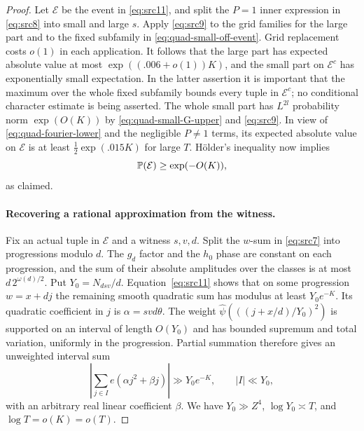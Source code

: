 \begin{proof}
Let $\mathcal E$ be the event in \eqref{eq:src11}, and split the
$P=1$ inner expression in \eqref{eq:src8} into small and large $s$.
Apply \eqref{eq:src9} to the grid families for the large part and to
the fixed subfamily in \eqref{eq:quad-small-off-event}.
Grid replacement costs $o(1)$ in each application.  It follows that
the large part has expected absolute value at most
$\exp((.006+o(1))K)$, and the small part on $\mathcal E^c$ has
exponentially small expectation.  In the latter assertion it is
important that the maximum over the whole fixed subfamily bounds
every tuple in $\mathcal E^c$; no conditional character estimate is
being asserted.
The whole small part has $L^{2l}$ probability norm $\exp(O(K))$ by
\eqref{eq:quad-small-G-upper} and \eqref{eq:src9}.
In view of \eqref{eq:quad-fourier-lower} and the negligible $P\ne1$
terms, its expected absolute value on $\mathcal E$ is at least
$\tfrac12\exp(.015K)$ for large $T$.
H\"older's inequality now implies
\begin{equation}\label{eq:quad-event-probability}
 \mathbb P(\mathcal E)\geq\exp(-O(K)),
\end{equation}
as claimed.

\paragraph{Recovering a rational approximation from the witness.}
Fix an actual tuple in $\mathcal E$ and a witness $s,v,d$.
Split the $w$-sum in \eqref{eq:src7} into progressions modulo $d$.
The $g_d$ factor and the $h_0$ phase are constant on each
progression, and the sum of their absolute amplitudes over the
classes is at most $d\,2^{\omega(d)/2}$.
Put $Y_0=N_{dsv}/d$.  Equation~\eqref{eq:src11} shows that on some
progression $w=x+dj$ the remaining smooth quadratic sum has modulus
at least $Y_0e^{-K}$.  Its quadratic coefficient in $j$ is
$\alpha=svd\theta$.  The weight
$\widehat\psi(((j+x/d)/Y_0)^2)$ is supported on an interval of
length $O(Y_0)$ and has bounded supremum and total variation,
uniformly in the progression.  Partial summation therefore gives an
unweighted interval sum
\[
 \left|\sum_{j\in I}e(\alpha j^2+\beta j)\right|
       \gg Y_0e^{-K},\qquad |I|\ll Y_0,
\]
with an arbitrary real linear coefficient $\beta$.
We have $Y_0\gg Z^4$, $\log Y_0\asymp T$, and
$\log T=o(K)=o(T)$.


\end{proof}
